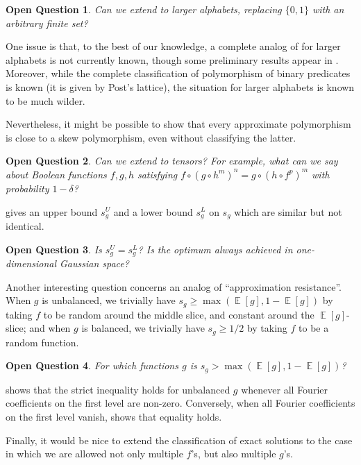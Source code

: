 \documentclass{article}
\newtheorem{open}{Open Question}
\theoremstyle{definition}
\theoremstyle{remark}
\DeclareMathOperator*{\E}{\mathbb{E}}
\renewcommand\ge{\geqslant}
\begin{document}
\begin{open}
Can we extend  to larger alphabets, replacing $\{0,1\}$ with an arbitrary finite set?
\end{open}

One issue is that, to the best of our knowledge, a complete analog of  for larger alphabets is not currently known, though some preliminary results appear in \cite{DH10,SX}. Moreover, while the complete classification of polymorphism of binary predicates is known (it is given by Post's lattice), the situation for larger alphabets is known to be much wilder.

Nevertheless, it might be possible to show that every approximate polymorphism is close to a skew polymorphism, even without classifying the latter.

\begin{open}
Can we extend  to tensors? For example, what can we say about Boolean functions $f,g,h$ satisfying $f \circ (g \circ h^m)^n = g \circ (h \circ f^p)^m$ with probability $1 - \delta$?
\end{open}

 gives an upper bound $s_g^U$ and a lower bound $s_g^L$ on $s_g$ which are similar but not identical.

\begin{open}
Is $s_g^U = s_g^L$? Is the optimum always achieved in one-dimensional Gaussian space?
\end{open}

Another interesting question concerns an analog of ``approximation resistance''.
When $g$ is unbalanced, we trivially have $s_g \ge \max(\E[g],1-\E[g])$ by taking $f$ to be random around the middle slice, and constant around the $\E[g]$-slice; and when $g$ is balanced, we trivially have $s_g \ge 1/2$ by taking $f$ to be a random function.

\begin{open}
For which functions $g$ is $s_g > \max(\E[g],1-\E[g])$?
\end{open}

 shows that the strict inequality holds for unbalanced $g$ whenever all Fourier coefficients on the first level are non-zero. Conversely, when all Fourier coefficients on the first level vanish,  shows that equality holds.

Finally, it would be nice to extend the classification of exact solutions to the case in which we are allowed not only multiple $f$'s, but also multiple $g$'s.
\end{document}
